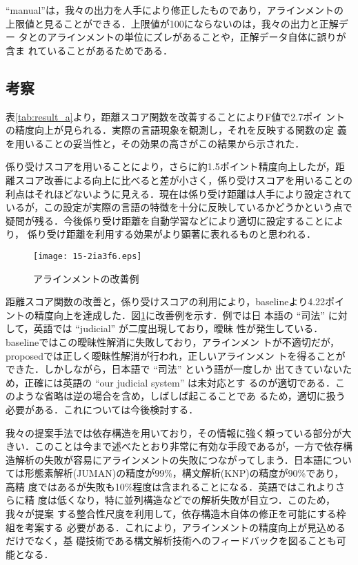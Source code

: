 \documentclass[japanese]{jnlp_1.4}
\begin{document}
``manual''は，我々の出力を人手により修正したものであり，アラインメントの
上限値と見ることができる．上限値が100にならないのは，我々の出力と正解デー
タとのアラインメントの単位にズレがあることや，正解データ自体に誤りが含ま
れていることがあるためである．


\subsection{考察}

表\ref{tab:result_a}より，距離スコア関数を改善することによりF値で2.7ポイ
ントの精度向上が見られる．実際の言語現象を観測し，それを反映する関数の定
義を用いることの妥当性と，その効果の高さがこの結果から示された．


係り受けスコアを用いることにより，さらに約1.5ポイント精度向上したが，距
離スコア改善による向上に比べると差が小さく，係り受けスコアを用いることの
利点はそれほどないように見える．現在は係り受け距離は人手により設定されて
いるが，この設定が実際の言語の特徴を十分に反映しているかどうかという点で
疑問が残る．今後係り受け距離を自動学習などにより適切に設定することにより，
係り受け距離を利用する効果がより顕著に表れるものと思われる．

\begin{figure}[b]
 \begin{center}
  \texttt{[image: 15-2ia3f6.eps]}
  \caption{アラインメントの改善例}
  \label{fig:result_ex}
 \end{center}
\end{figure}

距離スコア関数の改善と，係り受けスコアの利用により，baselineより4.22ポイ
ントの精度向上を達成した．図\ref{fig:result_ex}に改善例を示す．例では日
本語の ``司法'' に対して，英語では ``judicial'' が二度出現しており，曖昧
性が発生している．baselineではこの曖昧性解消に失敗しており，アラインメン
トが不適切だが，proposedでは正しく曖昧性解消が行われ，正しいアラインメン
トを得ることができた．しかしながら，日本語で ``司法'' という語が一度しか
出てきていないため，正確には英語の ``our judicial system'' は未対応とす
るのが適切である．このような省略は逆の場合を含め，しばしば起こることであ
るため，適切に扱う必要がある．これについては今後検討する．


我々の提案手法では依存構造を用いており，その情報に強く頼っている部分が大
きい．このことは今まで述べたとおり非常に有効な手段であるが，一方で依存構
造解析の失敗が容易にアラインメントの失敗につながってしまう．日本語につい
ては形態素解析(JUMAN)の精度が99\%，構文解析(KNP)の精度が90\%であり，高精
度ではあるが失敗も10\%程度は含まれることになる．英語ではこれよりさらに精
度は低くなり，特に並列構造などでの解析失敗が目立つ．このため，我々が提案
する整合性尺度を利用して，依存構造木自体の修正を可能にする枠組を考案する
必要がある．これにより，アラインメントの精度向上が見込めるだけでなく，基
礎技術である構文解析技術へのフィードバックを図ることも可能となる．
\end{document}
